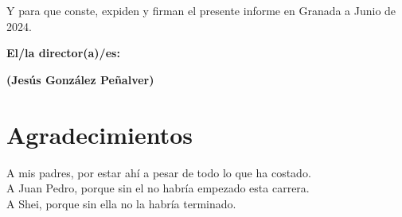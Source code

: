 \vspace{0.5cm}

Y para que conste, expiden y firman el presente informe en Granada a Junio de 2024.

\vspace{1cm}

\textbf{El/la director(a)/es: }

\vspace{5cm}

\noindent \textbf{(Jesús González Peñalver)}

\chapter*{Agradecimientos}

A mis padres, por estar ahí a pesar de todo lo que ha costado.\\

A Juan Pedro, porque sin el no habría empezado esta carrera.\\

A Shei, porque sin ella no la habría terminado.\\




